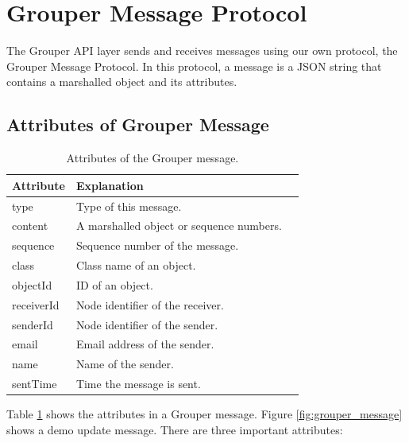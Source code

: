 \documentclass[a4paper,11pt]{report}
\begin{document}
\section{Grouper Message Protocol} \label{section:grouper_message_protocol}

The Grouper API layer sends and receives messages using our own protocol, the Grouper Message Protocol.
In this protocol, a message is a JSON string that contains a marshalled object and its attributes.

\subsection{Attributes of Grouper Message}

\begin{table}[t]
	\centering
	\begin{tabular}{lll}
		\toprule
		\textbf{Attribute} & \textbf{Explanation} \\ 
		\midrule
		type & Type of this message. \\
		content & A marshalled object or sequence numbers. \\
		sequence & Sequence number of the message. \\
		class & Class name of an object. \\
		objectId & ID of an object. \\
		receiverId & Node identifier of the receiver. \\
		senderId & Node identifier of the sender. \\
		email & Email address of the sender. \\
		name & Name of the sender. \\
		sentTime & Time the message is sent. \\
		\bottomrule
	\end{tabular}
	\caption{Attributes of the Grouper message.}
	\label{table:grouper_message_attributes}
\end{table}

Table \ref{table:grouper_message_attributes} shows the attributes in a Grouper message.
Figure \ref{fig:grouper_message} shows a demo update message.
There are three important attributes:
\end{document}
